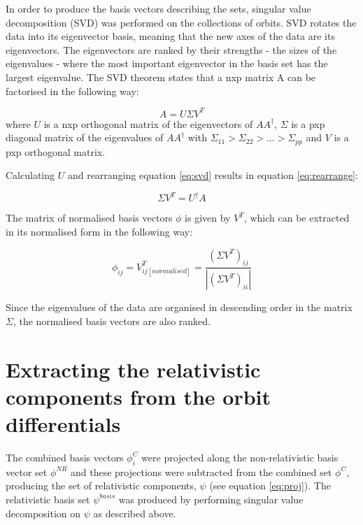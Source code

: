 \documentclass[11pt,a4paper]{article}
\begin{document}
In order to produce the basis vectors describing the sets, singular value decomposition (SVD) was performed on the collections of orbits. SVD rotates the data into its eigenvector basis, meaning that the new axes of the data are its eigenvectors. The eigenvectors are ranked by their strengths - the sizes of the eigenvalues - where the most important eigenvector in the basis set has the largest eigenvalue. The SVD theorem states that a nxp matrix A can be factorised in the following way:

\begin{equation}\label{eq:svd}
A = U \Sigma V^T
\end{equation}
where $U$ is a nxp orthogonal matrix of the eigenvectors of $A A^\dagger$, $\Sigma$ is a pxp diagonal matrix of the eigenvalues of $A A^\dagger$ with $\Sigma_{11} > \Sigma_{22} > ... > \Sigma_{pp}$ and $V$ is a pxp orthogonal matrix.

Calculating $U$ and rearranging equation \ref{eq:svd} results in equation \ref{eq:rearrange}:

\begin{equation}\label{eq:rearrange}
\Sigma V^T = U^\dagger A
\end{equation}

The matrix of normalised basis vectors $\phi$ is given by $V^T$, which can be extracted in its normalised form in the following way:

\begin{equation}
\phi_{ij} = V^T_{ij [normalised]} = \frac{(\Sigma V^T)_{ij}}{|(\Sigma V^T)_{ii}|}
\end{equation}

Since the eigenvalues of the data are organised in descending order in the matrix $\Sigma$, the normalised basis vectors are also ranked.


\section{Extracting the relativistic components from the orbit differentials}

The combined basis vectors $\phi^C_i$ were projected along the non-relativistic basis vector set $\phi^{NR}$ and these projections were subtracted from the combined set $\phi^C$, producing the set of relativistic components, $\psi$ (see equation \ref{eq:proj}). The relativistic basis set $\psi^{basis}$ was produced by performing singular value decomposition on $\psi$ as described above.
\end{document}
